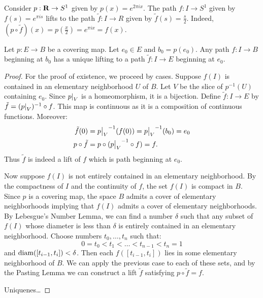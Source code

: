 \begin{example}
	Consider $p:\mathbf{R} \rightarrow S^1$ given by $p(x) = e^{2\pi i x}$. The path $f:I \rightarrow S^1$ given by $f(s) = e^{\pi i s}$ lifts to the path $\tilde{f}:I \rightarrow R$ given by $\tilde{f}(s) = \frac{s}{2}$. Indeed, $(p \circ \tilde{f})(x) = p \left( \frac{x}{2} \right) = e^{\pi i x} = f(x)$.
\end{example}

\begin{lemma}
	Let $p:E \rightarrow B$ be a covering map. Let $e_0 \in E$ and $b_0 = p(e_0)$. Any path $f:I \rightarrow B$ beginning at $b_0$ has a unique lifting to a path $\tilde{f}:I \rightarrow E$ beginning at $e_0$.
\end{lemma}
	\begin{proof}
		For the proof of existence, we proceed by cases. Suppose $f(I)$ is contained in an elementary neighborhood $U$ of $B$. Let $V$ be the slice of $p^{-1}(U)$ containing $e_0$. Since $\restr{p}{V}$ is a homeomorphism, it is a bijection. Define $\tilde{f}:I \rightarrow E$ by $\tilde{f} = (\restr{p}{V})^{-1} \circ f$. This map is continuous as it is a composition of continuous functions. Moreover:
		\begin{align*}
			\tilde{f}(0) &= \restr{p}{V}^{-1}(f(0)) = \restr{p}{V}^{-1}(b_0) = e_0 \\
			p \circ \tilde{f} &= p \circ (\restr{p}{V}^{-1} \circ f) = f.	
		\end{align*}
		Thus $\tilde{f}$ is indeed a lift of $f$ which is path beginning at $e_0$.

		Now suppose $f(I)$ is not entirely contained in an elementary neighborhood. By the compactness of $I$ and the continuity of $f$, the set $f(I)$ is compact in $B$. Since $p$ is a covering map, the space $B$ admits a cover of elementary neighborhoods \textemdash implying that $f(I)$ admits a cover of elementary neighborhoods. By Lebesgue's Number Lemma, we can find a number $\delta$ such that any subset of $f(I)$ whose diameter is less than $\delta$ is entirely contained in an elementary neighborhood. Choose numbers $t_0,\ldots,t_n$ such that:
		\[
			0 = t_0 < t_1 < \ldots < t_{n-1} < t_n = 1
		\] 
		and $\operatorname{diam}([t_{i-1},t_{i}]) < \delta$. Then each $f([t_{i-1},t_{i}])$ lies in some elementary neighborhood of $B$. We can apply the previous case to each of these sets, and by the Pasting Lemma we can construct a lift $\tilde{f}$ satisfying $p \circ \tilde{f} = f$.

		{\color{red}Uniquenes\ldots}
	\end{proof}

